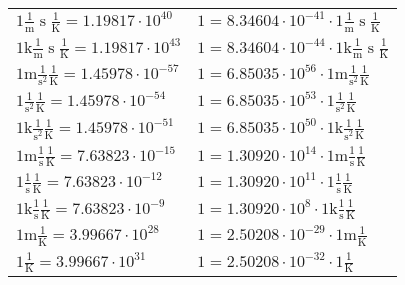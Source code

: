 \begin{center}
\begin{longtable}{l l}
{\color{black}$1 \bm{\mathrm{ }}\frac1{\operatorname{m}}{\operatorname{s}}{}\frac1{\operatorname{K}} = 1.19817\cdot10^{40} $}   & {\color{black}$ 1 = 8.34604\cdot10^{-41} \cdot 1 \bm{\mathrm{ }}\frac1{\operatorname{m}}{\operatorname{s}}{}\frac1{\operatorname{K}}$}  \\
{\color{gray}$1 \bm{\mathrm{ k}}\frac1{\operatorname{m}}{\operatorname{s}}{}\frac1{\operatorname{K}} = 1.19817\cdot10^{43} $}   & {\color{gray}$ 1 = 8.34604\cdot10^{-44} \cdot 1 \bm{\mathrm{ k}}\frac1{\operatorname{m}}{\operatorname{s}}{}\frac1{\operatorname{K}}$}  \\
{\color{gray}$1 \bm{\mathrm{ m}}{}\frac1{\operatorname{s}^2}{}\frac1{\operatorname{K}} = 1.45978\cdot10^{-57} $}   & {\color{gray}$ 1 = 6.85035\cdot10^{56} \cdot 1 \bm{\mathrm{ m}}{}\frac1{\operatorname{s}^2}{}\frac1{\operatorname{K}}$}  \\
{\color{black}$1 \bm{\mathrm{ }}{}\frac1{\operatorname{s}^2}{}\frac1{\operatorname{K}} = 1.45978\cdot10^{-54} $}   & {\color{black}$ 1 = 6.85035\cdot10^{53} \cdot 1 \bm{\mathrm{ }}{}\frac1{\operatorname{s}^2}{}\frac1{\operatorname{K}}$}  \\
{\color{gray}$1 \bm{\mathrm{ k}}{}\frac1{\operatorname{s}^2}{}\frac1{\operatorname{K}} = 1.45978\cdot10^{-51} $}   & {\color{gray}$ 1 = 6.85035\cdot10^{50} \cdot 1 \bm{\mathrm{ k}}{}\frac1{\operatorname{s}^2}{}\frac1{\operatorname{K}}$}  \\
{\color{gray}$1 \bm{\mathrm{ m}}{}\frac1{\operatorname{s}}{}\frac1{\operatorname{K}} = 7.63823\cdot10^{-15} $}   & {\color{gray}$ 1 = 1.30920\cdot10^{14} \cdot 1 \bm{\mathrm{ m}}{}\frac1{\operatorname{s}}{}\frac1{\operatorname{K}}$}  \\
{\color{black}$1 \bm{\mathrm{ }}{}\frac1{\operatorname{s}}{}\frac1{\operatorname{K}} = 7.63823\cdot10^{-12} $}   & {\color{black}$ 1 = 1.30920\cdot10^{11} \cdot 1 \bm{\mathrm{ }}{}\frac1{\operatorname{s}}{}\frac1{\operatorname{K}}$}  \\
{\color{gray}$1 \bm{\mathrm{ k}}{}\frac1{\operatorname{s}}{}\frac1{\operatorname{K}} = 7.63823\cdot10^{-9} $}   & {\color{gray}$ 1 = 1.30920\cdot10^{8} \cdot 1 \bm{\mathrm{ k}}{}\frac1{\operatorname{s}}{}\frac1{\operatorname{K}}$}  \\
{\color{gray}$1 \bm{\mathrm{ m}}{}{}{}\frac1{\operatorname{K}} = 3.99667\cdot10^{28} $}   & {\color{gray}$ 1 = 2.50208\cdot10^{-29} \cdot 1 \bm{\mathrm{ m}}{}{}{}\frac1{\operatorname{K}}$}  \\
{\color{black}$1 \bm{\mathrm{ }}{}{}{}\frac1{\operatorname{K}} = 3.99667\cdot10^{31} $}   & {\color{black}$ 1 = 2.50208\cdot10^{-32} \cdot 1 \bm{\mathrm{ }}{}{}{}\frac1{\operatorname{K}}$}  \\

\end{longtable}
\end{center}
